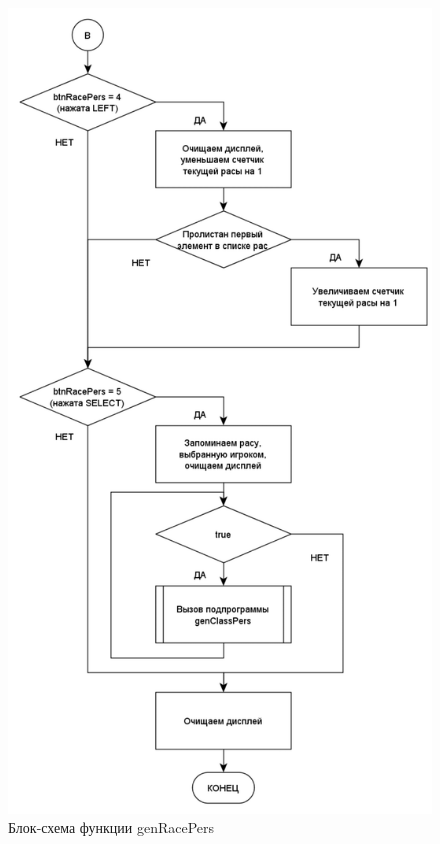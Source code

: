 \documentclass{altsu-report}
\begin{document}
\begin{figure}[H]
    \centering
    \includegraphics[scale=0.8]{genRacePers2.png}
    \caption{Блок-схема функции genRacePers}
    \label{fig:race2}
\end{figure}
\end{document}
